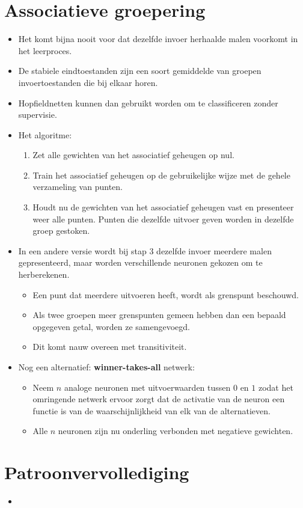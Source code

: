 \section{Associatieve groepering}
\begin{itemize}
    \item Het komt bijna nooit voor dat dezelfde invoer herhaalde malen voorkomt in het leerproces.
    \item De stabiele eindtoestanden zijn een soort gemiddelde van groepen invoertoestanden die bij elkaar horen.
    \item Hopfieldnetten kunnen dan gebruikt worden om te classificeren zonder supervisie.
    \item Het algoritme:
    \begin{enumerate}
        \item Zet alle gewichten van het associatief geheugen op nul.
        \item Train het associatief geheugen op de gebruikelijke wijze met de gehele verzameling van punten.
        \item Houdt nu de gewichten van het associatief geheugen vast en presenteer weer alle punten. Punten die dezelfde uitvoer geven worden in dezelfde groep gestoken.
    \end{enumerate}
    \item In een andere versie wordt bij stap 3 dezelfde invoer meerdere malen gepresenteerd, maar worden verschillende neuronen gekozen om te herberekenen.
    \begin{itemize}
        \item Een punt dat meerdere uitvoeren heeft, wordt als grenspunt beschouwd.
        \item Als twee groepen meer grenspunten gemeen hebben dan een bepaald opgegeven getal, worden ze samengevoegd.
        \item Dit komt nauw overeen met transitiviteit.
    \end{itemize}
    \item Nog een alternatief: \textbf{winner-takes-all} netwerk:
    \begin{itemize}
        \item Neem $n$ analoge neuronen met uitvoerwaarden tussen $0$ en $1$ zodat het omringende netwerk ervoor zorgt dat de activatie van de neuron een functie is van de waarschijnlijkheid van elk van de alternatieven.
        \item Alle $n$ neuronen zijn nu onderling verbonden met negatieve gewichten.
    \end{itemize}
\end{itemize}

\section{Patroonvervollediging}
\begin{itemize}
    \item 
\end{itemize}